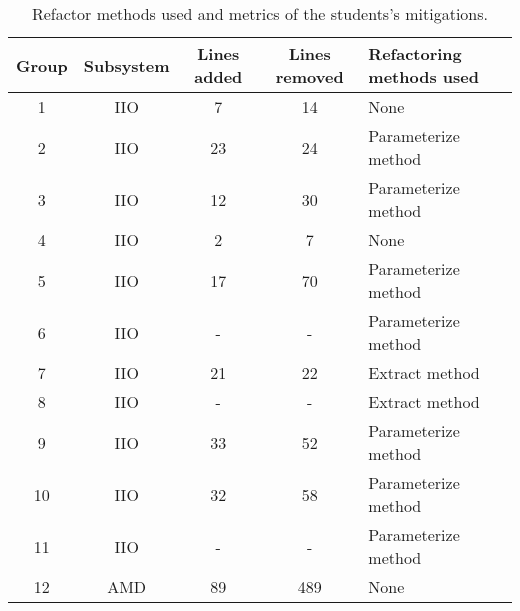 \begin{table}
\begin{tabular}{ | c | c | c | c | m{6em} | }

\hline

\textbf{Group} & \textbf{Subsystem} & \textbf{Lines added} & \textbf{Lines removed} & \textbf{Refactoring methods used}
\\ \hline 

1 & IIO & 7 & 14 & None \\ \hline
2 & IIO & 23 & 24 & Parameterize method \\ \hline
3 & IIO & 12 & 30 & Parameterize method \\ \hline
4 & IIO & 2 & 7 & None \\ \hline
5 & IIO & 17 & 70 & Parameterize method \\ \hline
6 & IIO & - & - & Parameterize method \\ \hline
7 & IIO & 21 & 22  & Extract method \\ \hline
8 & IIO & - & - & Extract method \\ \hline
9 & IIO & 33 & 52 & Parameterize method \\ \hline
10 & IIO & 32 & 58 & Parameterize method \\ \hline
11 & IIO & - & - & Parameterize method \\ \hline
12 & AMD & 89 & 489 & None \\ \hline

\hline
\end{tabular}
\caption{Refactor methods used and metrics of the students's mitigations.}
\label{tab:stu}
\end{table}
